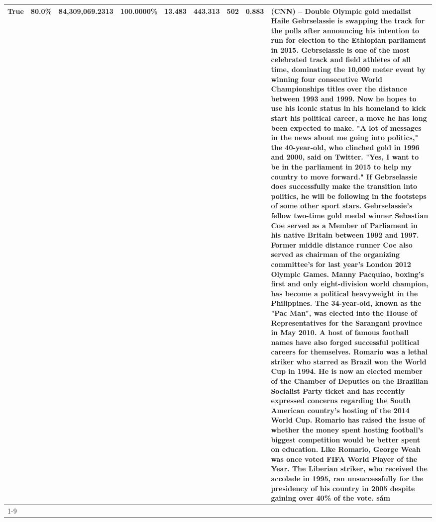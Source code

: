 \begin{table}[H]
{\begin{tabular}{lllrlllll}
True & 80.0\% & 84,309,069.2313 & \bfseries \color{red} 100.0000\% & 13.483 & 443.313 & 502 & 0.883 & (CNN) -- Double Olympic gold medalist Haile Gebrselassie is swapping the track for the polls after announcing his intention to run for election to the Ethiopian parliament in 2015. Gebrselassie is one of the most celebrated track and field athletes of all time, dominating the 10,000 meter event by winning four consecutive World Championships titles over the distance between 1993 and 1999. Now he hopes to use his iconic status in his homeland to kick start his political career, a move he has long been expected to make. "A lot of messages in the news about me going into politics," the 40-year-old, who clinched gold in 1996 and 2000, said on Twitter. "Yes, I want to be in the parliament in 2015 to help my country to move forward." If Gebrselassie does successfully make the transition into politics, he will be following in the footsteps of some other sport stars. Gebrselassie's fellow two-time gold medal winner Sebastian Coe served as a Member of Parliament in his native Britain between 1992 and 1997. Former middle distance runner Coe also served as chairman of the organizing committee's for last year's London 2012 Olympic Games. Manny Pacquiao, boxing's first and only eight-division world champion, has become a political heavyweight in the Philippines. The 34-year-old, known as the "Pac Man", was elected into the House of Representatives for the Sarangani province in May 2010. A host of famous football names have also forged successful political careers for themselves. Romario was a lethal striker who starred as Brazil won the World Cup in 1994. He is now an elected member of the Chamber of Deputies on the Brazilian Socialist Party ticket and has recently expressed concerns regarding the South American country's hosting of the 2014 World Cup. Romario has raised the issue of whether the money spent hosting football's biggest competition would be better spent on education. Like Romario, George Weah was once voted FIFA World Player of the Year. The Liberian striker, who received the accolade in 1995, ran unsuccessfully for the presidency of his country in 2005 despite gaining over 40\% of the vote. sám \\
\cline{1-9}

\end{tabular}}
\end{table}
